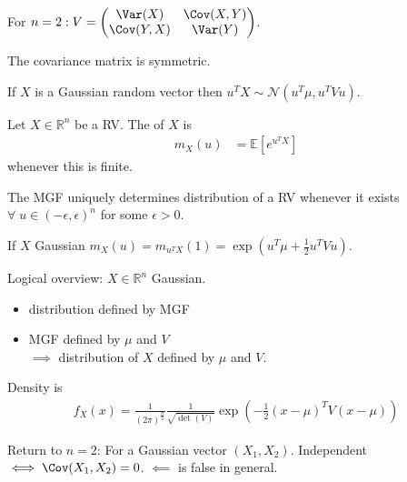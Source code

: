 For $n = 2: V = \begin{pmatrix}\Var(X) & \Cov(X, Y) \\ \Cov(Y, X) & \Var(Y)\end{pmatrix}$.

\begin{claim}
    The covariance matrix is symmetric.
\end{claim} 

\begin{claim}
    If $X$ is a Gaussian random vector then $u^T X \sim \mathcal{N}(u^T \mu, u^T V u)$.
\end{claim} 

\begin{definition}
    Let $X \in \mathbb{R}^n$ be a RV.
    The  of $X$ is 
    \begin{align*}
        m_X(u) &= \mathbb{E}\left[ e^{u^T X} \right]
    \end{align*} whenever this is finite.
\end{definition} 

\begin{theorem}
    The MGF uniquely determines distribution of a RV whenever it exists $\forall \; u \in (- \epsilon, \epsilon)^n$ for some $\epsilon > 0$.
\end{theorem} 

If $X$ Gaussian $m_X(u) = m_{u^T X}(1) = \exp \left( u^T \mu + \frac{1}{2} u^T V u \right)$.

Logical overview: $X \in \mathbb{R}^n$ Gaussian.
\begin{itemize}
    \item distribution defined by MGF
    \item MGF defined by $\mu$ and $V$ \\
    $\implies$ distribution of $X$ defined by $\mu$ and $V$.
\end{itemize} 

\begin{remark}
    Density is \begin{align*}
        f_X(x) = \frac{1}{(2 \pi)^\frac{n}{2}} \frac{1}{\sqrt{\det(V)}} \exp \left( - \frac{1}{2} (x - \mu)^T V (x - \mu) \right)
    \end{align*} 
\end{remark} 

Return to $n = 2$: For a Gaussian vector $(X_1, X_2)$. 
Independent $\iff \Cov(X_1, X_2) = 0$. $\impliedby$ is false in general.

